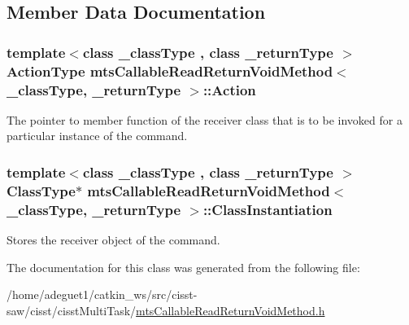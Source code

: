 \subsection{Member Data Documentation}
\hypertarget{classmts_callable_read_return_void_method_a869753a539aea4804f5b0e928786b83a}{
\subsubsection[{Action}]{\setlength{\rightskip}{0pt plus 5cm}template$<$class \-\_\-class\-Type , class \-\_\-return\-Type $>$ {\bf Action\-Type} {\bf mts\-Callable\-Read\-Return\-Void\-Method}$<$ \-\_\-class\-Type, \-\_\-return\-Type $>$\-::Action\hspace{0.3cm}{\ttfamily [protected]}}}\label{classmts_callable_read_return_void_method_a869753a539aea4804f5b0e928786b83a}
The pointer to member function of the receiver class that is to be invoked for a particular instance of the command. \hypertarget{classmts_callable_read_return_void_method_af6aea9b2b635f8ea4be1f2946fa7f1c7}{
\subsubsection[{Class\-Instantiation}]{\setlength{\rightskip}{0pt plus 5cm}template$<$class \-\_\-class\-Type , class \-\_\-return\-Type $>$ {\bf Class\-Type}$\ast$ {\bf mts\-Callable\-Read\-Return\-Void\-Method}$<$ \-\_\-class\-Type, \-\_\-return\-Type $>$\-::Class\-Instantiation\hspace{0.3cm}{\ttfamily [protected]}}}\label{classmts_callable_read_return_void_method_af6aea9b2b635f8ea4be1f2946fa7f1c7}
Stores the receiver object of the command. 

The documentation for this class was generated from the following file\-:\begin{DoxyCompactItemize}
\item 
/home/adeguet1/catkin\-\_\-ws/src/cisst-\/saw/cisst/cisst\-Multi\-Task/\hyperlink{mts_callable_read_return_void_method_8h}{mts\-Callable\-Read\-Return\-Void\-Method.\-h}\end{DoxyCompactItemize}
